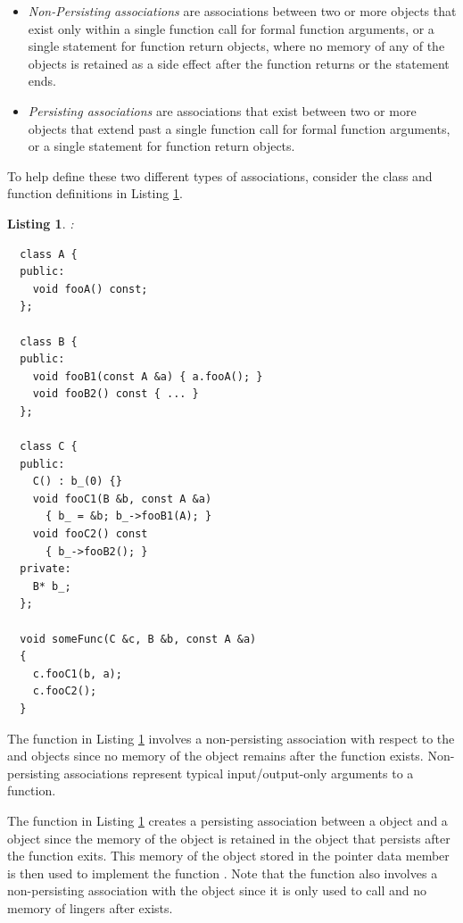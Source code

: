 \documentclass[pdf,ps2pdf,11pt]{SANDreport}
\newtheorem{listing}{Listing}
\begin{document}
\begin{itemize}

{}\item\textit{Non-Persisting associations} are associations between
two or more objects that exist only within a single function call for
formal function arguments, or a single statement for function return
objects, where no memory of any of the objects is retained as a side
effect after the function returns or the statement ends.

{}\item\textit{Persisting associations} are associations that exist
between two or more objects that extend past a single function call
for formal function arguments, or a single statement for function
return objects.

\end{itemize}

To help define these two different types of associations, consider the
class and function definitions in Listing
{}\ref{listing:NonPersistingPersistingAssociationsRawPointers}.

\begin{listing}:\\
\label{listing:NonPersistingPersistingAssociationsRawPointers}
{\small\begin{verbatim}
  class A {
  public:
    void fooA() const;
  };

  class B {
  public:
    void fooB1(const A &a) { a.fooA(); }
    void fooB2() const { ... }
  };

  class C {
  public:
    C() : b_(0) {}
    void fooC1(B &b, const A &a)
      { b_ = &b; b_->fooB1(A); }
    void fooC2() const
      { b_->fooB2(); }
  private:
    B* b_;    
  };

  void someFunc(C &c, B &b, const A &a)
  {
    c.fooC1(b, a);
    c.fooC2();
  }
\end{verbatim}}
\end{listing}

The function {} in Listing
{}\ref{listing:NonPersistingPersistingAssociationsRawPointers}
involves a non-persisting association with respect to the {}
and {} objects since no memory of the object {}
remains after the function {} exists.
Non-persisting associations represent typical input/output-only
arguments to a function.

The function {} in Listing
{}\ref{listing:NonPersistingPersistingAssociationsRawPointers} creates
a persisting association between a {} object and a
{} object since the memory of the {} object is
retained in the {} object that persists after the function
{} exits.  This memory of the {}
object stored in the {} pointer data member is then
used to implement the function {}.  Note that the
function {} also involves a non-persisting
association with the {} object {} since it is only
used to call {} and no memory of {}
lingers after {} exists.
\end{document}
